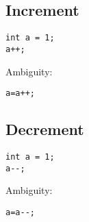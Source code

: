 
\subsection{Increment}

\begin{verbatim}
int a = 1;
a++;
\end{verbatim}


Ambiguity:
\begin{verbatim}
a=a++;
\end{verbatim}


\subsection{Decrement}

\begin{verbatim}
int a = 1;
a--;
\end{verbatim}

Ambiguity:
\begin{verbatim}
a=a--;
\end{verbatim}


